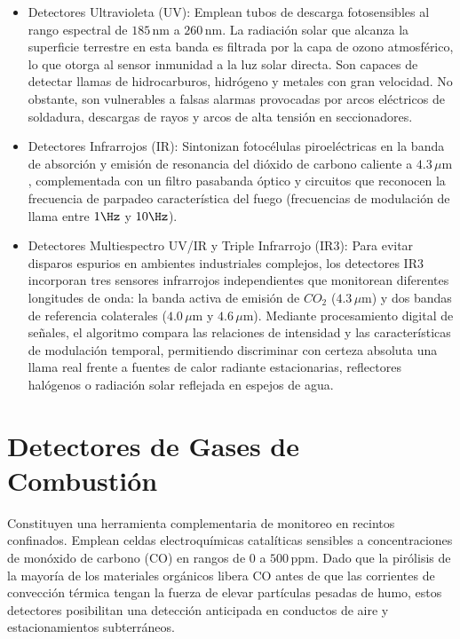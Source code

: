 \begin{itemize}
    \item Detectores Ultravioleta (UV): Emplean tubos de descarga fotosensibles al rango espectral de $185\,\mathrm{nm}$ a
          $260\,\mathrm{nm}$. La radiación solar que alcanza la superficie terrestre en esta banda es filtrada por la capa de
          ozono atmosférico, lo que otorga al sensor inmunidad a la luz solar directa. Son capaces de detectar llamas de
          hidrocarburos, hidrógeno y metales con gran velocidad. No obstante, son vulnerables a falsas alarmas provocadas por
          arcos eléctricos de soldadura, descargas de rayos y arcos de alta tensión en seccionadores.
    \item Detectores Infrarrojos (IR): Sintonizan fotocélulas piroeléctricas en la banda de absorción y emisión de
          resonancia del dióxido de carbono caliente a $4.3\,\mu\mathrm{m}$, complementada con un filtro pasabanda óptico y
          circuitos que reconocen la frecuencia de parpadeo característica del fuego (frecuencias de modulación de llama
          entre $1\Hz$ y $10\Hz$).
    \item Detectores Multiespectro UV/IR y Triple Infrarrojo (IR3): Para evitar disparos espurios en ambientes industriales
          complejos, los detectores IR3 incorporan tres sensores infrarrojos independientes que monitorean diferentes
          longitudes de onda: la banda activa de emisión de $CO_2$ ($4.3\,\mu\mathrm{m}$) y dos bandas de referencia
          colaterales ($4.0\,\mu\mathrm{m}$ y $4.6\,\mu\mathrm{m}$). Mediante procesamiento digital de señales, el algoritmo
          compara las relaciones de intensidad y las características de modulación temporal, permitiendo discriminar con
          certeza absoluta una llama real frente a fuentes de calor radiante estacionarias, reflectores halógenos o radiación
          solar reflejada en espejos de agua.
\end{itemize}

\section{Detectores de Gases de Combustión}

Constituyen una herramienta complementaria de monitoreo en recintos confinados. Emplean celdas electroquímicas catalíticas
sensibles a concentraciones de monóxido de carbono (CO) en rangos de $0$ a $500\,\text{ppm}$. Dado que la pirólisis de la
mayoría de los materiales orgánicos libera CO antes de que las corrientes de convección térmica tengan la fuerza de elevar
partículas pesadas de humo, estos detectores posibilitan una detección anticipada en conductos de aire y estacionamientos
subterráneos.

